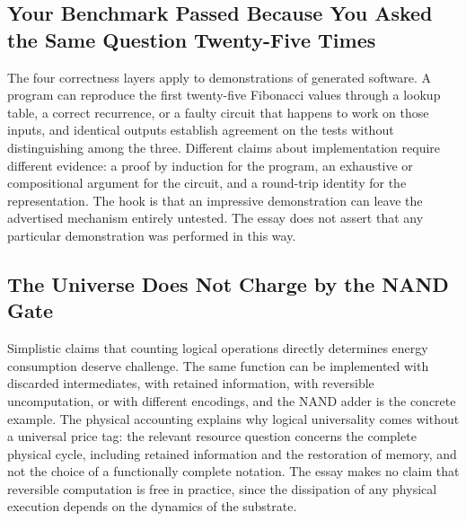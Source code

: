 \documentclass[11pt]{article}
\theoremstyle{definition}
\theoremstyle{remark}
\begin{document}
\subsection{Your Benchmark Passed Because You Asked the Same Question Twenty-Five Times}

The four correctness layers apply to demonstrations of generated software. A program can reproduce the first twenty-five Fibonacci values through a lookup table, a correct recurrence, or a faulty circuit that happens to work on those inputs, and identical outputs establish agreement on the tests without distinguishing among the three. Different claims about implementation require different evidence: a proof by induction for the program, an exhaustive or compositional argument for the circuit, and a round-trip identity for the representation. The hook is that an impressive demonstration can leave the advertised mechanism entirely untested. The essay does not assert that any particular demonstration was performed in this way.

\subsection{The Universe Does Not Charge by the NAND Gate}

Simplistic claims that counting logical operations directly determines energy consumption deserve challenge. The same function can be implemented with discarded intermediates, with retained information, with reversible uncomputation, or with different encodings, and the NAND adder is the concrete example. The physical accounting explains why logical universality comes without a universal price tag: the relevant resource question concerns the complete physical cycle, including retained information and the restoration of memory, and not the choice of a functionally complete notation. The essay makes no claim that reversible computation is free in practice, since the dissipation of any physical execution depends on the dynamics of the substrate.
\end{document}
